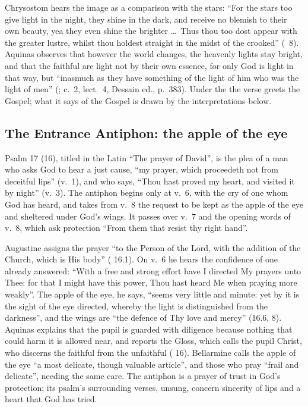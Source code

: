 Chrysostom hears the image as a comparison with the stars: ``For the stars too
give light in the night, they shine in the dark, and receive no blemish to
their own beauty, yea they even shine the brighter \ldots\ Thus thou too dost
appear with the greater lustre, whilst thou holdest straight in the midst of
the crooked'' (~8). Aquinas observes that
however the world changes, the heavenly lights stay bright, and that the
faithful are light not by their own essence, for only God is light in that
way, but ``inasmuch as they have something of the light of him who was the
light of men'' (;  c.~2, lect.~4, Dessain ed.,
p.~383). Under the  the verse greets the Gospel; what
it says of the Gospel is drawn by the interpretations below.

\subsection{The Entrance Antiphon: the apple of the eye}

Psalm 17 (16), titled in the Latin ``The prayer of David'', is the plea of a
man who asks God to hear a just cause, ``my prayer, which proceedeth not from
deceitful lips'' (v.~1), and who says, ``Thou hast proved my heart, and
visited it by night'' (v.~3). The antiphon begins only at v.~6, with the cry
of one whom God has heard, and takes from v.~8 the request to be kept as the
apple of the eye and sheltered under God's wings. It passes over v.~7 and the
opening words of v.~8, which ask protection ``From them that resist thy right
hand''.

Augustine assigns the prayer ``to the Person of the Lord, with the addition of
the Church, which is His body'' ( 16.1). On v.~6
he hears the confidence of one already answered: ``With a free and strong
effort have I directed My prayers unto Thee: for that I might have this power,
Thou hast heard Me when praying more weakly''. The apple of the eye, he says,
``seems very little and minute: yet by it is the sight of the eye directed,
whereby the light is distinguished from the darkness'', and the wings are
``the defence of Thy love and mercy'' (16.6, 8). Aquinas explains that the
pupil is guarded with diligence because nothing that could harm it is allowed
near, and reports the Gloss, which calls the pupil Christ, who discerns the
faithful from the unfaithful ( 16). Bellarmine
calls the apple of the eye ``a most delicate, though valuable article'', and
those who pray ``frail and delicate'', needing the same care. The antiphon is a prayer of trust in
God's protection; its psalm's surrounding verses, unsung, concern sincerity of
lips and a heart that God has tried.

